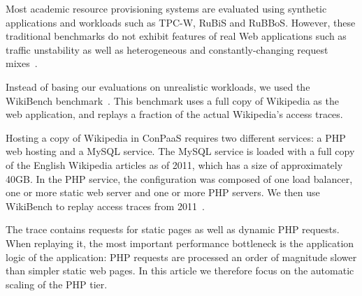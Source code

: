 

Most academic resource provisioning systems are evaluated using
synthetic applications and workloads such as TPC-W, RuBiS and
RuBBoS. However, these traditional benchmarks do not exhibit features
of real Web applications such as traffic unstability as well as
heterogeneous and constantly-changing request mixes~\cite{benchlab}.

Instead of basing our evaluations on unrealistic workloads, we used
the WikiBench benchmark~\cite{wikibench}. This benchmark uses a full
copy of Wikipedia as the web application, and replays a fraction of
the actual Wikipedia's access traces. 


Hosting a copy of Wikipedia in ConPaaS requires two different
services: a PHP web hosting and a MySQL service. The MySQL service is
loaded with a full copy of the English Wikipedia articles as of 2011,
which has a size of approximately 40GB.  In the PHP service, the
configuration was composed of one load balancer, one or more static web server
and one or more PHP servers. We then use WikiBench to replay access
traces from 2011~\cite{urdaneta2009}.





The trace contains requests for static pages as well as dynamic PHP
requests. When replaying it, the most important performance bottleneck
is the application logic of the application: PHP requests are
processed an order of magnitude slower than simpler static web
pages. In this article we therefore focus on the automatic scaling of
the PHP tier.

